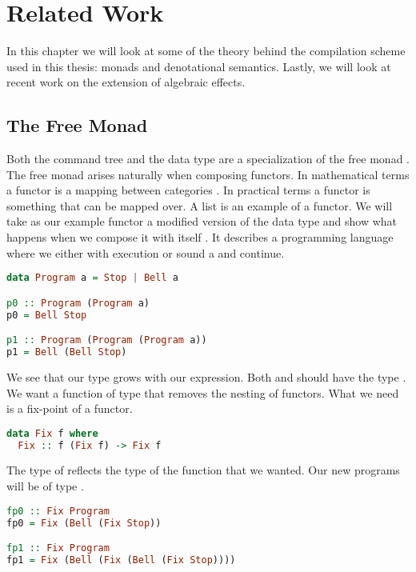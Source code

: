 
\chapter{\label{chap:related-work}Related Work}
In this chapter we will look at some of the theory behind the compilation scheme used in this thesis: monads and denotational semantics. Lastly, we will look at recent work on the extension of algebraic effects.

\section{\label{section:freemonad}The Free Monad}
Both the command tree and the  data type are a specialization of the free monad \autocite{swierstra2008data}. The free monad arises naturally when composing functors. In mathematical terms a functor is a mapping between categories \autocite{barr1990category}. In practical terms a functor is something that can be mapped over. A list is an example of a functor. We will take as our example functor a modified version of the  data type and show what happens when we compose it with itself \autocite{freemonadsforall}. It describes a programming language where we either  with execution or sound a  and continue.

\begin{lstlisting}[language=Haskell]
data Program a = Stop | Bell a

p0 :: Program (Program a)
p0 = Bell Stop

p1 :: Program (Program (Program a))
p1 = Bell (Bell Stop)
\end{lstlisting}

We see that our type grows with our expression. Both  and  should have the type . We want a function of type  that removes the nesting of functors. What we need is a fix-point of a functor.

\begin{lstlisting}[language=Haskell]
data Fix f where
  Fix :: f (Fix f) -> Fix f
\end{lstlisting}

The type of  reflects the type of the function that we wanted. Our new programs will be of type .

\begin{lstlisting}[language=Haskell]
fp0 :: Fix Program
fp0 = Fix (Bell (Fix Stop))

fp1 :: Fix Program
fp1 = Fix (Bell (Fix (Bell (Fix Stop))))
\end{lstlisting}


